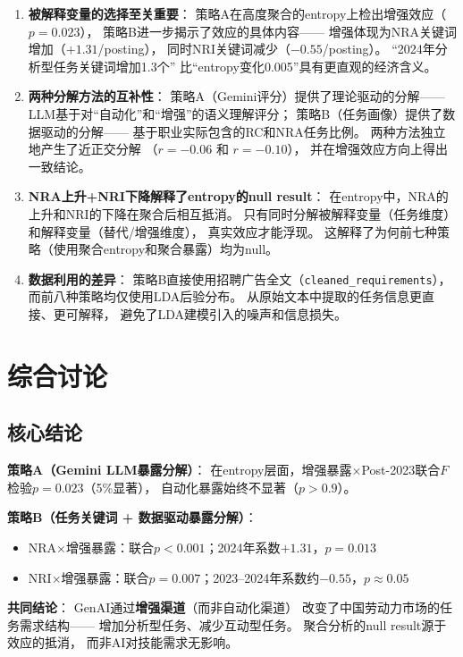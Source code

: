 \documentclass[12pt,a4paper]{ctexart}
\begin{document}
\begin{enumerate}
\item \textbf{被解释变量的选择至关重要}：
      策略A在高度聚合的entropy上检出增强效应（$p=0.023$），
      策略B进一步揭示了效应的具体内容——
      增强体现为NRA关键词增加（$+1.31$/posting），
      同时NRI关键词减少（$-0.55$/posting）。
      ``2024年分析型任务关键词增加1.3个''
      比``entropy变化0.005''具有更直观的经济含义。

\item \textbf{两种分解方法的互补性}：
      策略A（Gemini评分）提供了理论驱动的分解——
      LLM基于对``自动化''和``增强''的语义理解评分；
      策略B（任务画像）提供了数据驱动的分解——
      基于职业实际包含的RC和NRA任务比例。
      两种方法独立地产生了近正交分解
      （$r=-0.06$ 和 $r=-0.10$），
      并在增强效应方向上得出一致结论。

\item \textbf{NRA上升+NRI下降解释了entropy的null result}：
      在entropy中，NRA的上升和NRI的下降在聚合后相互抵消。
      只有同时分解被解释变量（任务维度）和解释变量（替代/增强维度），
      真实效应才能浮现。
      这解释了为何前七种策略（使用聚合entropy和聚合暴露）均为null。

\item \textbf{数据利用的差异}：
      策略B直接使用招聘广告全文（\texttt{cleaned\_requirements}），
      而前八种策略均仅使用LDA后验分布。
      从原始文本中提取的任务信息更直接、更可解释，
      避免了LDA建模引入的噪声和信息损失。
\end{enumerate}


\section{综合讨论}
\label{sec:discussion}

\subsection{核心结论}

\begin{resultbox}[两种策略的核心发现]

\textbf{策略A（Gemini LLM暴露分解）}：
在entropy层面，增强暴露$\times$Post-2023联合$F$检验$p=0.023$（5\%显著），
自动化暴露始终不显著（$p>0.9$）。

\textbf{策略B（任务关键词 + 数据驱动暴露分解）}：
\begin{itemize}
\item NRA$\times$增强暴露：联合$p<0.001$；2024年系数$+1.31$，$p=0.013$
\item NRI$\times$增强暴露：联合$p=0.007$；2023--2024年系数约$-0.55$，$p\approx 0.05$
\end{itemize}

\textbf{共同结论}：
GenAI通过\textbf{增强渠道}（而非自动化渠道）
改变了中国劳动力市场的任务需求结构——
增加分析型任务、减少互动型任务。
聚合分析的null result源于效应的抵消，
而非AI对技能需求无影响。
\end{resultbox}
\end{document}
